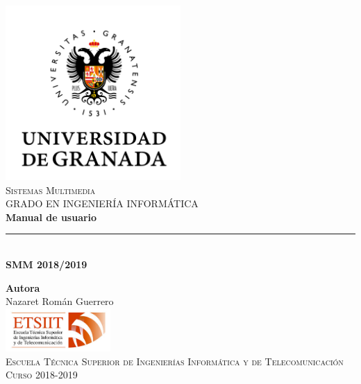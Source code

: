 \documentclass[11pt,a4paper]{article}
\begin{document}
\begin{titlepage}

\begin{minipage}{\textwidth}

\centering
\includegraphics[width=0.5\textwidth]{logo.png}\\

\textsc{\Large Sistemas Multimedia\\[0.2cm]}
\textsc{GRADO EN INGENIERÍA INFORMÁTICA}\\[1cm]

{\huge \bfseries Manual de usuario\\}
\noindent\rule[-1ex]{\textwidth}{3pt}\\[3.5ex]
{\large\bfseries SMM 2018/2019}
\end{minipage}

\vspace{1.5cm}
\begin{minipage}{\textwidth}
\centering

\textbf{Autora}\\ {Nazaret Román Guerrero}\\[2.5ex]
\includegraphics[width=0.3\textwidth]{etsiit.jpeg}\\[0.1cm]
\vspace{1cm}
\textsc{Escuela Técnica Superior de Ingenierías Informática y de Telecomunicación}\\
\vspace{1cm}
\textsc{Curso 2018-2019}
\end{minipage}
\end{titlepage}

\tableofcontents
\thispagestyle{empty}
\end{document}
